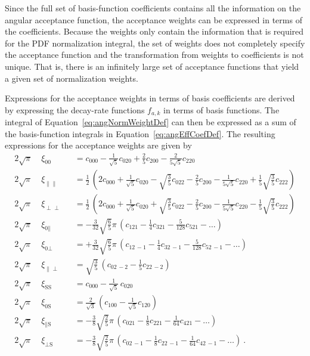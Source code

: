 Since the full set of basis-function coefficients contains all the information on the angular acceptance function, the acceptance weights
can be expressed in terms of the coefficients. Because the weights only contain the information that is required for the PDF normalization
integral, the set of weights does not completely specify the acceptance function and the transformation from weights to coefficients is
not unique. That is, there is an infinitely large set of acceptance functions that yield a given set of normalization weights.

Expressions for the acceptance weights in terms of basis coefficients are derived by expressing the decay-rate functions $f_{a,k}$ in terms
of basis functions. The integral of Equation~\ref{eq:angNormWeightDef} can then be expressed as a sum of the basis-function integrals in
Equation~\ref{eq:angEffCoefDef}. The resulting expressions for the acceptance weights are given by
\begin{equation}
  \label{eq:angCoefToWeight}
  \begin{alignedat}{2}
    2\sqrt{\pi}\; &\xi_{\text{00}} &
      &= c_{000} - \tfrac{1}{\sqrt{5}} c_{020} + \tfrac{2}{5} c_{200} - \tfrac{2}{5\sqrt{5}} c_{220} \\
    2\sqrt{\pi}\; &\xi_{\parallel\parallel} &
      &= \tfrac{1}{2}\,(2 c_{000} + \tfrac{1}{\sqrt{5}} c_{020} - \sqrt{\tfrac{3}{5}} c_{022} - \tfrac{2}{5} c_{200}
         - \tfrac{1}{5\sqrt{5}} c_{220} + \tfrac{1}{5}\sqrt{\tfrac{3}{5}} c_{222}) \\
    2\sqrt{\pi}\; &\xi_{\perp\perp} &
      &= \tfrac{1}{2}\,(2 c_{000} + \tfrac{1}{\sqrt{5}} c_{020} + \sqrt{\tfrac{3}{5}} c_{022} - \tfrac{2}{5} c_{200}
         - \tfrac{1}{5\sqrt{5}} c_{220} - \tfrac{1}{5}\sqrt{\tfrac{3}{5}} c_{222}) \\
    2\sqrt{\pi}\; &\xi_{\text{0}\parallel} &
      &= -\tfrac{3}{32}\sqrt{\tfrac{6}{5}}\pi\, (c_{121} - \tfrac{1}{4} c_{321} - \tfrac{5}{128} c_{521} - \ldots) \\
    2\sqrt{\pi}\; &\xi_{\text{0}\perp} &
      &= +\tfrac{3}{32}\sqrt{\tfrac{6}{5}}\pi\, (c_{12\,-1} - \tfrac{1}{4} c_{32\,-1} - \tfrac{5}{128} c_{52\,-1} - \ldots) \\
    2\sqrt{\pi}\; &\xi_{\parallel\perp} &
      &= \sqrt{\tfrac{3}{5}}\, (c_{02\,-2} - \tfrac{1}{5} c_{22\,-2}) \\
    2\sqrt{\pi}\; &\xi_{\text{SS}} &
      &= c_{000} - \tfrac{1}{\sqrt{5}}\,c_{020} \\
    2\sqrt{\pi}\; &\xi_{\text{0S}} &
      &= \tfrac{2}{\sqrt{3}}\, (c_{100} - \tfrac{1}{\sqrt{5}} c_{120}) \\
    2\sqrt{\pi}\; &\xi_{\parallel\text{S}} &
      &= -\tfrac{3}{8}\sqrt{\tfrac{2}{5}}\pi\, (c_{021} - \tfrac{1}{8} c_{221} - \tfrac{1}{64} c_{421} - \ldots) \\
    2\sqrt{\pi}\; &\xi_{\perp\text{S}} &
      &= -\tfrac{3}{8}\sqrt{\tfrac{2}{5}}\pi\, (c_{02\,-1} - \tfrac{1}{8} c_{22\,-1} - \tfrac{1}{64} c_{42\,-1} - \ldots) \ .
  \end{alignedat}
\end{equation}

